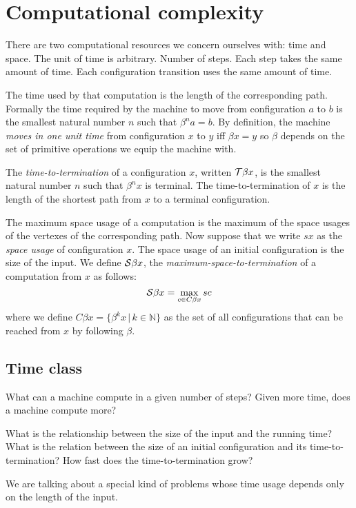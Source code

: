 \chapter{Computational complexity}

There are two computational resources we concern ourselves with:
time and space.
The unit of time is arbitrary.
Number of steps. Each step takes the same amount of time.
Each configuration transition uses the same amount of time.

The time used by that computation is the length of the corresponding path.
Formally the time required by the machine
to move from configuration $a$ to $b$ is
the smallest natural number $n$ such that $\beta^n a = b$.
By definition, the machine \emph{moves in one unit time} from configuration $x$ to $y$ iff $\beta x = y$
so $\beta$ depends on the set of primitive operations we equip the machine with.

The \emph{time-to-termination} of a configuration $x$,
written $\mathcal{T} \beta x$,
is the smallest natural number $n$ such that $\beta^n x$ is terminal.
The time-to-termination of $x$ is the length of the shortest path from $x$ to a terminal configuration.

The maximum space usage of a computation is
the maximum of the space usages of the vertexes of the corresponding path.
Now suppose that we write $s x$ as the \emph{space usage} of configuration $x$.
The space usage of an initial configuration is the size of the input.
We define $\mathcal{S} \beta x$,
the \emph{maximum-space-to-termination} of a computation from $x$
as follows:
\begin{equation}
    \mathcal{S} \beta x = \max_{c \in C \beta x} s c
\end{equation}
where we define
$C \beta x = \{ \beta^k x \,|\, k \in \mathbb N \}$
as the set of all configurations
that can be reached from $x$ by following $\beta$.

\section{Time class}

What can a machine compute in a given number of steps?
Given more time, does a machine compute more?

What is the relationship between the size of the input and the running time?
What is the relation between the size of
an initial configuration and its time-to-termination?
How fast does the time-to-termination grow?

We are talking about a special kind of problems
whose time usage depends only on the length of the input.

